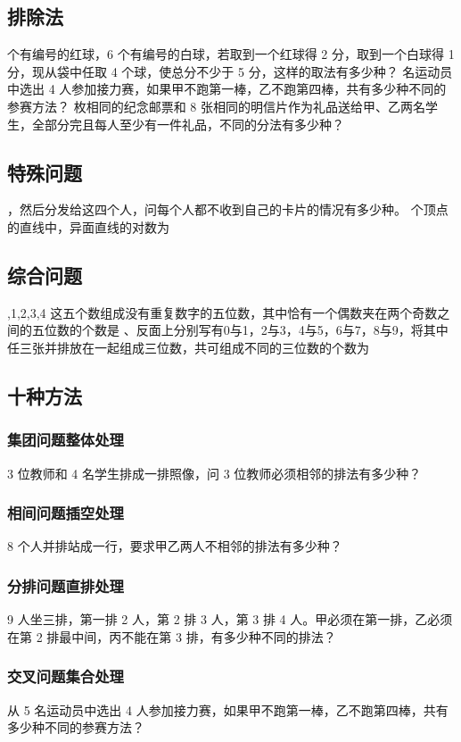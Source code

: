 \documentclass{article}
\begin{document}
    \subsection{排除法}
         个有编号的红球，6 个有编号的白球，若取到一个红球得 2 分，取到一个白球得 1 分，现从袋中任取 4 个球，使总分不少于 5 分，这样的取法有多少种？
         名运动员中选出 4 人参加接力赛，如果甲不跑第一棒，乙不跑第四棒，共有多少种不同的参赛方法？
         枚相同的纪念邮票和 8 张相同的明信片作为礼品送给甲、乙两名学生，全部分完且每人至少有一件礼品，不同的分法有多少种？
    \subsection{特殊问题}
        ，然后分发给这四个人，问每个人都不收到自己的卡片的情况有多少种。
         个顶点的直线中，异面直线的对数为\lines
    \subsection{综合问题}
        ,1,2,3,4 这五个数组成没有重复数字的五位数，其中恰有一个偶数夹在两个奇数之间的五位数的个数是\lines
        、反面上分别写有0与1，2与3，4与5，6与7，8与9，将其中任三张并排放在一起组成三位数，共可组成不同的三位数的个数为\lines
    \subsection{十种方法}%
        \subsubsection{集团问题整体处理}
            3 位教师和 4 名学生排成一排照像，问 3 位教师必须相邻的排法有多少种？%
        \subsubsection{相间问题插空处理}
            8 个人并排站成一行，要求甲乙两人不相邻的排法有多少种？%
        \subsubsection{分排问题直排处理}
            9 人坐三排，第一排 2 人，第 2 排 3 人，第 3 排 4 人。甲必须在第一排，乙必须在第 2 排最中间，丙不能在第 3 排，有多少种不同的排法？%
        \subsubsection{交叉问题集合处理}
            从 5 名运动员中选出 4 人参加接力赛，如果甲不跑第一棒，乙不跑第四棒，共有多少种不同的参赛方法？%
\end{document}
